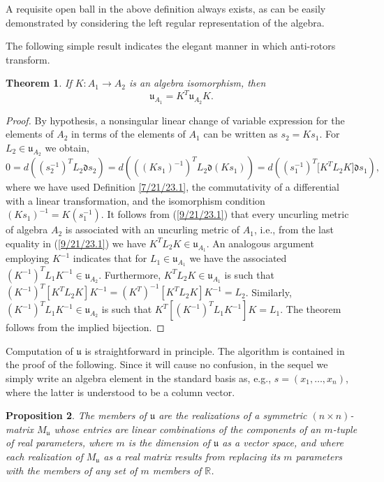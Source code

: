 \documentclass{amsart}
\numberwithin{equation}{section}
\newtheorem{theorem}{Theorem}
\newtheorem{proposition}[theorem]{Proposition}
\theoremstyle{definition}
\numberwithin{theorem}{section}
\begin{document}
   
     A requisite open ball in the above definition always exists, as can be easily demonstrated by considering the left regular representation of the algebra. 

The following simple result indicates the elegant manner in which anti-rotors transform.

\begin{theorem} \label{6/6/23.1} If $K:A_1\rightarrow A_2$ is an algebra isomorphism, then \begin{equation}\label{5/23/23.1} \mathfrak{u}_{A_1} = K^T \mathfrak{u}_{A_2} K. \end{equation} \end{theorem}

\begin{proof} By hypothesis, a nonsingular linear change of variable expression for the elements of $A_2$ in terms of the elements of $A_1$ can be written as $s_2= Ks_1$. \mbox{For $L_2\in \mathfrak{u}_{A_2}$} we obtain, \begin{equation} 0 = d\left((s_2^{-1})^T L_2 \mathfrak{d}s_2\right) =  d\left(((Ks_1)^{-1})^T L_2 \mathfrak{d}(Ks_1)\right) = d\left((s_1^{-1})^T \big[K^T L_2K\big]\mathfrak{d}s_1\right), \label{9/21/23.1}  \end{equation} where we have used Definition \ref{7/21/23.1}, the commutativity of a differential with a linear transformation, and the isomorphism condition $(Ks_1)^{-1} = K(s_1^{-1})$.   It follows from (\ref{9/21/23.1}) that every uncurling metric  of algebra $A_2$ is associated with an uncurling metric of $A_1$, i.e., from the last equality in (\ref{9/21/23.1}) we have  $K^TL_2K\in\mathfrak{u}_{A_1}$.  An analogous argument employing $K^{-1}$ indicates that for $L_1\in\mathfrak{u}_{A_1}$ we have the associated $(K^{-1})^T L_1 K^{-1} \in \mathfrak{u}_{A_2}$.    Furthermore, $K^T L_2K\in\mathfrak{u}_{A_1}$ is such that $(K^{-1})^T [K^T L_2 K]K^{-1} = (K^T)^{-1} [K^T L_2 K]K^{-1} = L_2$.  Similarly, $(K^{-1})^T L_1K^{-1}\in\mathfrak{u}_{A_2}$ is such that $K^T[(K^{-1})^T L_1K^{-1}] K = L_1$.  The theorem follows from the implied bijection. 
\end{proof}

Computation of $\mathfrak{u}$ is straightforward in principle.  The algorithm is contained in the proof of the following.  Since it will cause no confusion, in the sequel we simply write an algebra element in the standard basis as, e.g., $s=(x_1,\dots,x_n)$, where the latter is understood to be a column vector.

\begin{proposition}\label{9/2/24.1} The members of $\mathfrak{u}$ are the realizations of a symmetric $(n\times n)$-matrix $M_{\mathfrak{u}}$ whose entries are linear combinations of the components of an $m$-tuple of real parameters, where $m$ is the dimension of $\mathfrak{u}$ as a vector space, and where each realization of $M_{\mathfrak{u}}$ as a real matrix results from replacing its $m$ parameters with the members of any set of $m$ members of $\mathbb{R}$.   
\end{proposition}
\end{document}
